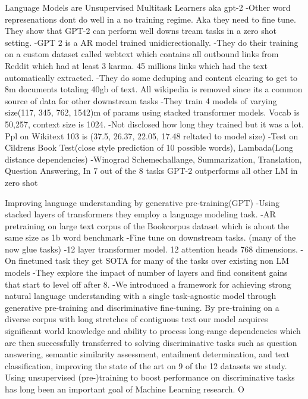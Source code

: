 Language Models are Unsupervised Multitask Learners aka gpt-2
-Other word represenations dont do well in a no training regime. Aka they need to fine tune. They show that GPT-2 can perform well downs tream tasks in a zero shot setting. 
-GPT 2 is a AR model trained unidicrectionally.
-They do their training on a custom dataset called webtext which contains all outbound links from Reddit which had at least 3 karma. 45 millions links which had the text automatically extracted. 
-They do some deduping and content clearing to get to 8m documents totaling 40gb of text. All wikipedia is removed since its a common source of data for other downstream tasks
-They train 4 models of varying size(117, 345, 762, 1542)m of params using stacked transformer models.  Vocab is 50,257, context size is 1024.
-Not disclosed how long they trained but it was a lot.  Ppl on Wikitext 103 is (37.5, 26.37, 22.05, 17.48 reltated to model size) 
-Test on Cildrens Book Test(close style prediction of 10 possible words), Lambada(Long distance dependencies)
-Winograd Schemechallange, Summarization, Translation, Question Answering, In 7 out of the 8 tasks GPT-2 outperforms all other LM in zero shot 

Improving language understanding by generative pre-training(GPT)
-Using stacked layers of transformers they employ a language modeling task. 
-AR pretraining on large text corpus of the Bookcorpus dataset which is about the same size as 1b word benchmark
-Fine tune on downstream tasks. (many of the now glue tasks)
-12 layer transformer model.  12 attention heads 768 dimensions. 
-On finetuned task they get SOTA for many of the tasks over existing non LM models
-They explore the impact of number of layers and find consitent gains that start to level off after 8. 
-We introduced a framework for achieving strong natural language understanding with a single
task-agnostic model through generative pre-training and discriminative fine-tuning. By pre-training
on a diverse corpus with long stretches of contiguous text our model acquires significant world
knowledge and ability to process long-range dependencies which are then successfully transferred to
solving discriminative tasks such as question answering, semantic similarity assessment, entailment
determination, and text classification, improving the state of the art on 9 of the 12 datasets we
study. Using unsupervised (pre-)training to boost performance on discriminative tasks has long
been an important goal of Machine Learning research. O



